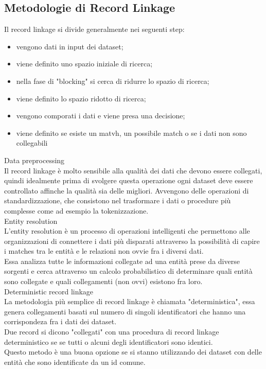 \documentclass[a4paper,12pt]{article}
\begin{document}
\subsection{Metodologie di Record Linkage}
Il record linkage si divide generalmente nei seguenti step:
\begin{itemize}
\item vengono dati in input dei dataset;
\item viene definito uno spazio iniziale di ricerca;
\item nella fase di "blocking" si cerca di ridurre lo spazio di ricerca;
\item viene definito lo spazio ridotto di ricerca;
\item vengono comporati i dati e viene presa una decisione;
\item viene definito se esiste un matvh, un possibile match o se i dati non sono collegabili
\end{itemize}

Data preprocessing %
\\
Il record linkage è molto sensibile alla qualità dei dati che devono essere collegati, quindi idealmente prima di svolgere questa operazione ogni dataset deve essere controllato affinche la qualità sia delle migliori. Avvengono delle operazioni di standardizzazione, che consistono nel trasformare i dati o procedure più complesse come ad esempio la tokenizzazione.\\

Entity resolution %
\\
L'entity resolution è un processo di operazioni intelligenti che permettono alle organizzazioni di connettere i dati più disparati attraverso la possibilità di capire i matches tra le entità e le relazioni non ovvie fra i diversi dati.\\
Essa analizza tutte le informazioni collegate ad una entità prese da diverse sorgenti e cerca attraverso un calcolo probabilistico di determinare quali entità sono collegate e quali collegamenti (non ovvi) esistono fra loro.\\

Deterministic record linkage %
\\
La metodologia più semplice di record linkage è chiamata "deterministica", essa genera collegamenti basati sul numero di singoli identificatori che hanno una corrispondeza fra i dati dei dataset.\\
Due record si dicono "collegati" con una procedura di record linkage deterministico se se tutti o alcuni degli identificatori sono identici.\\
Questo metodo è una buona opzione se si stanno utilizzando dei dataset con delle entità che sono identificate da un id comune.\\
\end{document}
